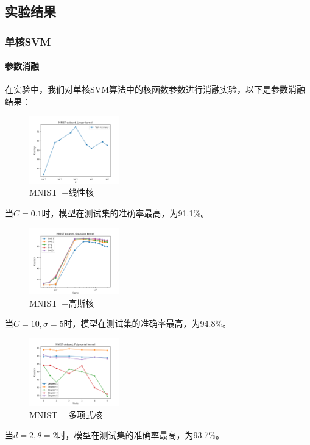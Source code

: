 \documentclass[a4paper]{article}
\begin{document}
\subsection{实验结果}
\subsubsection{单核SVM}
\paragraph*{参数消融}
在实验中，我们对单核SVM算法中的核函数参数进行消融实验，以下是参数消融结果：
\begin{figure}[H]
    \centering
    \includegraphics[width=0.35\textwidth]{pictures/single kernel/参数消融+MNIST+线性核.png}
    \caption{MNIST\ +线性核}
\end{figure}
当$C=0.1$时，模型在测试集的准确率最高，为91.1\%。

\begin{figure}[H]
    \centering
    \includegraphics[width=0.35\textwidth]{pictures/single kernel/参数消融+MNIST+高斯核.png}
    \caption{MNIST\ +高斯核}
\end{figure}
当$C=10, \sigma=5$时，模型在测试集的准确率最高，为94.8\%。

\begin{figure}[H]
    \centering
    \includegraphics[width=0.35\textwidth]{pictures/single kernel/参数消融+MNIST+多项式核.png}
    \caption{MNIST\ +多项式核}
\end{figure}
当$d=2, \theta=2$时，模型在测试集的准确率最高，为93.7\%。
\end{document}
